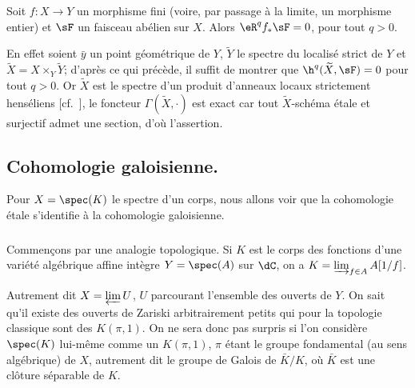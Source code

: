 \begin{propositiondotdash}\label{I:2-3-6}
Soit $f:X\to Y$ un morphisme fini (voire, par passage à la limite, un 
morphisme entier) et $\sF$ un faisceau abélien sur $X$. Alors $\eR^q f_* \sF=0$, 
pour tout $q>0$.
\end{propositiondotdash}

En effet soient $\bar y$ un point géométrique de $Y$, $\widetilde Y$ le 
spectre du localisé strict de $Y$  et 
$\widetilde X=X\times_Y \widetilde Y$; d'après ce qui précède, il suffit de 
montrer que $\h^q(\widetilde X,\sF) = 0$ pour tout $q>0$. Or $\widetilde X$ est le 
spectre d'un produit d'anneaux locaux strictement henséliens 
[cf.\ ], le foncteur $\Gamma(\widetilde X,\cdot)$ est exact car tout 
$\widetilde X$-schéma étale et surjectif admet une section, d'où l'assertion. 










\subsection{Cohomologie galoisienne.}\label{I:2-4}

Pour $X=\spec(K)$ le spectre d'un corps, nous allons voir que la cohomologie 
étale s'identifie à la cohomologie galoisienne. 





\subsubsection{}\label{I:2-4-1}

Commençons par une analogie topologique. Si $K$ est le corps des fonctions 
d'une variété algébrique affine intègre $Y=\spec(A)$ sur $\dC$, on a 
$K=\varinjlim_{f\in A} A[1/f]$. 

Autrement dit $X=\varprojlim U$, $U$ parcourant l'ensemble des ouverts de $Y$. 
On sait qu'il existe des ouverts de Zariski arbitrairement petits qui pour la 
topologie classique sont des $K(\pi,1)$. On ne sera donc pas surpris si l'on 
considère $\spec(K)$ lui-même comme un $K(\pi,1)$, $\pi$ étant le groupe 
fondamental (au sens algébrique) de $X$, autrement dit le groupe de Galois de 
$\bar K/K$, où $\bar K$ est une clôture séparable de $K$. 






